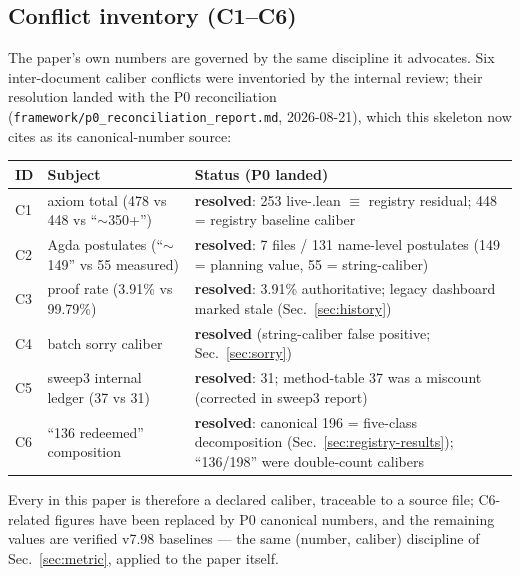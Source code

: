 \subsection{Conflict inventory (C1--C6)}
\label{sec:conflicts}
The paper's own numbers are governed by the same discipline it
advocates. Six inter-document caliber conflicts were inventoried by
the internal review; their resolution landed with the P0 reconciliation
(\texttt{framework/p0\_reconciliation\_report.md}, 2026-08-21), which
this skeleton now cites as its canonical-number source:

\begin{center}
\begin{tabular}{@{}llp{5.6cm}@{}}
\toprule
\textbf{ID} & \textbf{Subject} & \textbf{Status (P0 landed)} \\
\midrule
C1 & axiom total (478 vs 448 vs ``$\sim$350+'') & \textbf{resolved}:
253 live-.lean $\equiv$ registry residual; 448 = registry baseline
caliber \\
C2 & Agda postulates (``$\sim$149'' vs 55 measured) & \textbf{resolved}:
7 files / 131 name-level postulates (149 = planning value, 55 =
string-caliber) \\
C3 & proof rate (3.91\% vs 99.79\%) & \textbf{resolved}: 3.91\%
authoritative; legacy dashboard marked stale (Sec.~\ref{sec:history}) \\
C4 & batch sorry caliber & \textbf{resolved} (string-caliber false
positive; Sec.~\ref{sec:sorry}) \\
C5 & sweep3 internal ledger (37 vs 31) & \textbf{resolved}: 31;
method-table 37 was a miscount (corrected in sweep3 report) \\
C6 & ``136 redeemed'' composition & \textbf{resolved}: canonical 196 =
five-class decomposition (Sec.~\ref{sec:registry-results});
``136/198'' were double-count calibers \\
\bottomrule
\end{tabular}
\end{center}

Every  in this paper is therefore a declared caliber,
traceable to a source file; C6-related figures have been replaced by
P0 canonical numbers, and the remaining values are verified v7.98
baselines --- the same (number, caliber) discipline of
Sec.~\ref{sec:metric}, applied to the paper itself.
